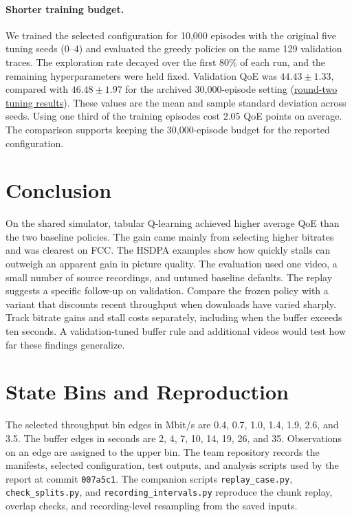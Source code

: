 \documentclass[10pt,letterpaper]{article}
\begin{document}
\paragraph{Shorter training budget.}
We trained the selected configuration for 10,000 episodes with the original
five tuning seeds (0--4) and evaluated the greedy policies on the same 129
validation traces. The exploration rate decayed over the first 80\% of each
run, and the remaining hyperparameters were held fixed. Validation QoE was
\(44.43\pm1.33\), compared with \(46.48\pm1.97\) for the archived 30,000-episode
setting (\href{https://github.com/Bobby-Zhu/abr-q-learning/blob/2169df2/results/q_learning/tuning.csv}{round-two tuning results}).
These values are the mean and sample standard deviation across seeds.
Using one third of the training episodes cost 2.05 QoE points on average.
The comparison supports keeping the 30,000-episode budget for the reported
configuration.

\section{Conclusion}

On the shared simulator, tabular Q-learning achieved higher average QoE than
the two baseline policies. The gain came mainly from selecting higher
bitrates and was clearest on FCC. The HSDPA examples show how quickly stalls
can outweigh an apparent gain in picture quality. The evaluation used one
video, a small number of source recordings, and untuned baseline defaults.
The replay suggests a specific follow-up on validation. Compare the frozen
policy with a variant that discounts recent throughput when downloads have
varied sharply. Track bitrate gains and stall costs separately, including
when the buffer exceeds ten seconds. A validation-tuned buffer rule and
additional videos would test how far these findings generalize.

\clearpage
\appendix
\section{State Bins and Reproduction}

The selected throughput bin edges in Mbit/s are 0.4, 0.7, 1.0, 1.4, 1.9,
2.6, and 3.5. The buffer edges in seconds are 2, 4, 7, 10, 14, 19, 26, and
35. Observations on an edge are assigned to the upper bin. The team
repository records the manifests, selected configuration, test outputs, and
analysis scripts used by the report at commit \texttt{007a5c1}. The companion
scripts \texttt{replay\_case.py}, \texttt{check\_splits.py}, and
\texttt{recording\_intervals.py} reproduce the chunk replay, overlap checks,
and recording-level resampling from the saved inputs.
\end{document}
